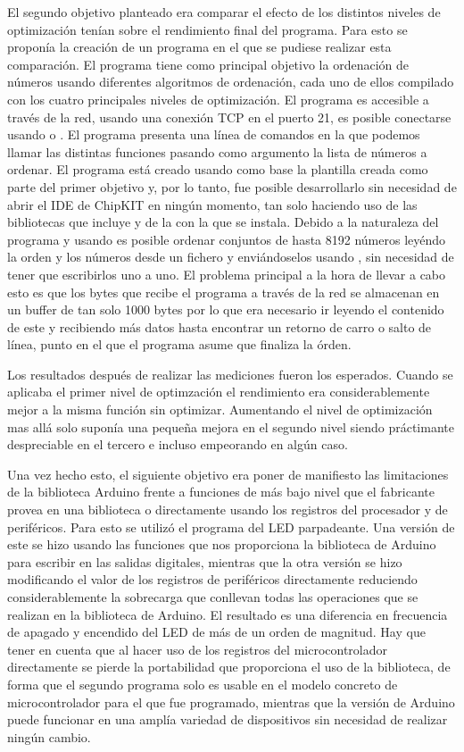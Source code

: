 El segundo objetivo planteado era comparar el efecto de los distintos niveles de optimización tenían sobre el rendimiento final del programa. Para esto se proponía la creación de un programa en el que se pudiese realizar esta comparación. El programa tiene como principal objetivo la ordenación de números usando diferentes algoritmos de ordenación, cada uno de ellos compilado con los cuatro principales niveles de optimización. El programa es accesible a través de la red, usando una conexión TCP en el puerto 21, es posible conectarse usando  o . El programa presenta una línea de comandos en la que podemos llamar las distintas funciones pasando como argumento la lista de números a ordenar. El programa está creado usando como base la plantilla creada como parte del primer objetivo y, por lo tanto, fue posible desarrollarlo sin necesidad de abrir el IDE de ChipKIT en ningún momento, tan solo haciendo uso de las bibliotecas que incluye y de la  con la que se instala. Debido a la naturaleza del programa y usando  es posible ordenar conjuntos de hasta 8192 números leyéndo la orden y los números desde un fichero y enviándoselos usando , sin necesidad de tener que escribirlos uno a uno. El problema principal a la hora de llevar a cabo esto es que los bytes que recibe el programa a través de la red se almacenan en un buffer de tan solo 1000 bytes por lo que era necesario ir leyendo el contenido de este y recibiendo más datos hasta encontrar un retorno de carro o salto de línea, punto en el que el programa asume que finaliza la órden.

Los resultados después de realizar las mediciones fueron los esperados. Cuando se aplicaba el primer nivel de optimzación el rendimiento era considerablemente mejor a la misma función sin optimizar. Aumentando el nivel de optimización mas allá solo suponía una pequeña mejora en el segundo nivel siendo práctimante despreciable en el tercero e incluso empeorando en algún caso. 

Una vez hecho esto, el siguiente objetivo era poner de manifiesto las limitaciones de la biblioteca Arduino frente a funciones de más bajo nivel que el fabricante provea en una biblioteca o directamente usando los registros del procesador y de periféricos. Para esto se utilizó el programa del LED parpadeante. Una versión de este se hizo usando las funciones que nos proporciona la biblioteca de Arduino para escribir en las salidas digitales, mientras que la otra versión se hizo modificando el valor de los registros de periféricos directamente reduciendo considerablemente la sobrecarga que conllevan todas las operaciones que se realizan en la biblioteca de Arduino. El resultado es una diferencia en frecuencia de apagado y encendido del LED de más de un orden de magnitud. Hay que tener en cuenta que al hacer uso de los registros del microcontrolador directamente se pierde la portabilidad que proporciona el uso de la biblioteca, de forma que el segundo programa solo es usable en el modelo concreto de microcontrolador para el que fue programado, mientras que la versión de Arduino puede funcionar en una amplía variedad de dispositivos sin necesidad de realizar ningún cambio.

